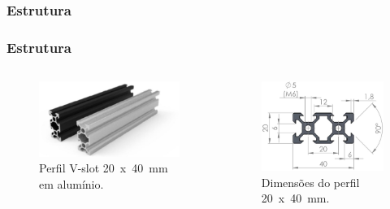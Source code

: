 \subsubsection{Estrutura}

\begin{frame}
\frametitle{Estrutura}

\begin{columns}
        \begin{figure}
            \centering
            \includegraphics[scale = 0.14]{figuras/p20x40p}
            \caption{Perfil V-slot  20~x~40~mm em alumínio.}
        \end{figure}
        \begin{figure}
            \centering
            \includegraphics[scale = 0.14]{figuras/p20x40d.jpeg}
            \caption{Dimensões do perfil 20~x~40~mm.}
        \end{figure}
\end{columns}

\end{frame}
    

